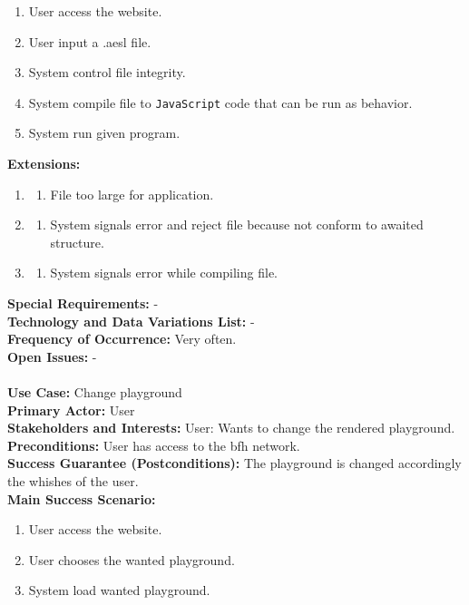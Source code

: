 \documentclass{scrbook}
\begin{document}
\begin{enumerate}
  \item User access the website.
  \item User input a .aesl file.
  \item System control file integrity.
  \item System compile file to \texttt{JavaScript} code that can be run as behavior.
  \item System run given program.
\end{enumerate}
\textbf{Extensions: }
\begin{enumerate}\addtocounter{enumi}{1}
  \item 
  \begin{enumerate}
    \item File too large for application.
  \end{enumerate}
  \item
  \begin{enumerate}
    \item System signals error and reject file because not conform to awaited structure.
  \end{enumerate}
  \item 
  \begin{enumerate}
    \item System signals error while compiling file.
  \end{enumerate}
\end{enumerate}
\textbf{Special Requirements: }- \\
\textbf{Technology and Data Variations List: }- \\
\textbf{Frequency of Occurrence: }Very often. \\
\textbf{Open Issues: }- \\
\\
\textbf{Use Case: }Change playground \\
\textbf{Primary Actor: }User \\
\textbf{Stakeholders and Interests: }User: Wants to change the rendered playground. \\
\textbf{Preconditions: }User has access to the bfh network. \\
\textbf{Success Guarantee (Postconditions): }The playground is changed accordingly the whishes of the user. \\
\textbf{Main Success Scenario: }
\begin{enumerate}
  \item User access the website.
  \item User chooses the wanted playground.
  \item System load wanted playground.
\end{enumerate}
\end{document}
